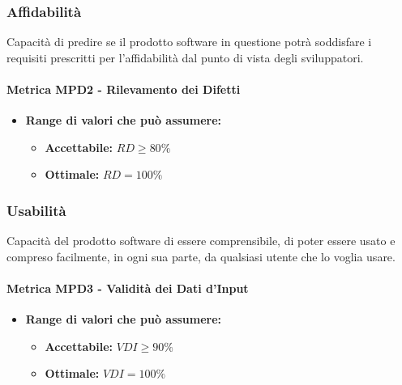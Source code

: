 \subsubsection{Affidabilità} 
Capacità di predire se il prodotto software in questione potrà soddisfare i requisiti prescritti per l'affidabilità dal punto di vista degli sviluppatori.

\paragraph{Metrica MPD2 - Rilevamento dei Difetti} 
\begin{itemize}
    \item \textbf{Range di valori che può assumere:}
    \begin{itemize}
        \item \textbf{Accettabile:} $RD \geq 80\% $
        \item \textbf{Ottimale:} $RD = 100\%$
    \end{itemize}
\end{itemize}

\subsubsection{Usabilità} 
Capacità del prodotto software di essere comprensibile, di poter essere usato e compreso facilmente, in ogni sua parte, da qualsiasi utente che lo voglia usare.\\
\paragraph{Metrica MPD3 - Validità dei Dati d'Input} 
\begin{itemize}
    \item \textbf{Range di valori che può assumere:}
    \begin{itemize}
        \item \textbf{Accettabile:} $VDI \geq 90\%$
        \item \textbf{Ottimale:} $VDI = 100\%$
    \end{itemize}
\end{itemize}

